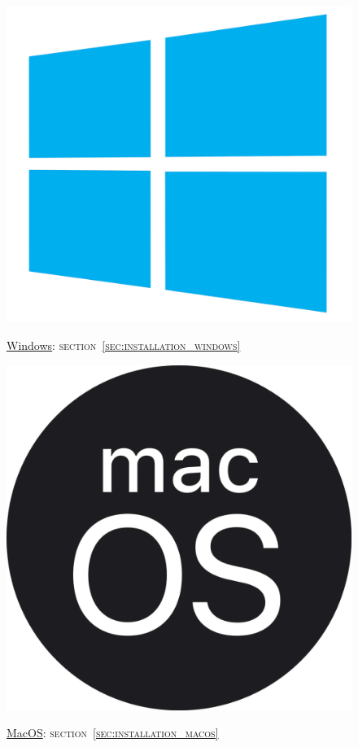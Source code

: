 \begin{figure}[!h]
\begin{minipage}{0.32\textwidth}
        \hyperref[sec:installation_windows]{\includegraphics[scale=0.020]{Images_formation/WindowsLogo.pdf}}
        \caption*{\underline{Windows}: \textsc{section~\ref{sec:installation_windows}}}
    \end{minipage}
    \begin{minipage}{0.32\textwidth}
        \centering
        \hyperref[sec:installation_macos]{\includegraphics[scale=0.025]{Images_formation/MacosLogo.pdf}}
        \caption*{\underline{MacOS}: \textsc{section~\ref{sec:installation_macos}}}
    \end{minipage}
\end{figure}
